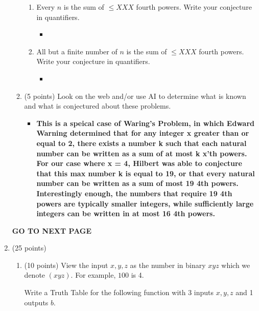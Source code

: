 \documentclass[12pt]{article}
\newcommand{\N}{{\mathbb N}}
\begin{document}
\begin{enumerate}
\begin{enumerate}
\begin{enumerate}
\item 
Every $n$ is the sum of $\le XXX$ fourth powers. 
Write your conjecture in quantifiers. 
\begin{itemize}
    \item \boldmath{$\forall n \in \N \: \exists x_1 \exists x_2 \ldots \exists x_{19} \in \N \: (n = (x_1)^4 + (x_2)^4 \ldots + (x_{19})^4)$}
\end{itemize}
\item
All but a finite number of $n$ is the sum of $\le XXX$ fourth powers. 
Write your conjecture in quantifiers. 
\begin{itemize}
    \item {}
\end{itemize}
\end{enumerate}
\item
(5 points) 
Look on the web and/or use AI to determine what is known and what is conjectured
about these problems.
\begin{itemize}
    \item \textbf{This is a speical case of Waring's Problem, in which Edward Warning determined that for any integer x greater than or equal to 2, there exists a number k such that each natural number can be written as a sum of at most k x'th powers. For our case where x = 4, Hilbert was able to conjecture that this max number k is equal to 19, or that every natural number can be written as a sum of most 19 4th powers. Interestingly enough, the numbers that require 19 4th powers are typically smaller integers, while sufficiently large integers can be written in at most 16 4th powers.}
\end{itemize}
\end{enumerate}

\vfill

\centerline{\bf GO TO NEXT PAGE}

\newpage



\item
(25 points) 
\begin{enumerate}
\item
(10 points)
View the input $x,y,z$ as the number in binary $xyz$ which we denote $(xyz)$. 
For example, $100$ is 4. 

Write a Truth Table for the following function with 3 inputs $x,y,z$ and 1 outputs $b$. 


\end{enumerate}
\end{enumerate}
\end{document}
